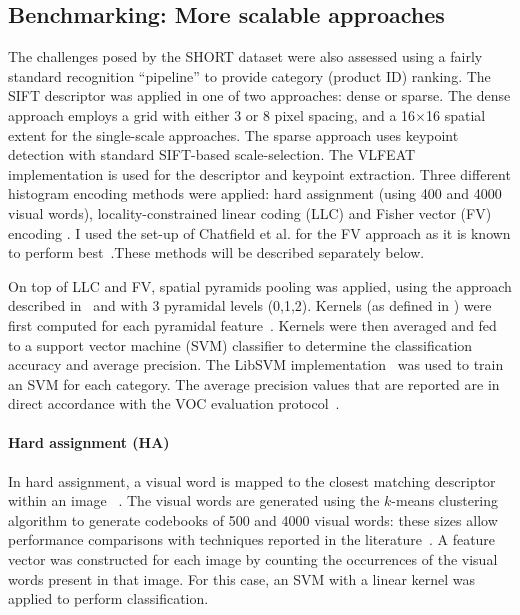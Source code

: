 


\subsection{Benchmarking: More scalable approaches}
\label{sec:bof}

The challenges posed by the SHORT dataset were also assessed using a fairly standard recognition ``pipeline'' to provide category (product ID) ranking. The SIFT descriptor was applied in one of two approaches: dense or sparse. The dense approach employs a grid with either 3 or 8 pixel spacing, and a 16$\times$16 spatial extent for the single-scale approaches. The sparse approach uses keypoint detection with standard SIFT-based scale-selection. The VLFEAT implementation is used for the descriptor and keypoint extraction. Three different histogram encoding methods were applied: hard assignment \cite{Csurka2004} (using 400 and 4000 visual words), locality-constrained linear coding (LLC) \cite{Wang2010} and Fisher vector (FV) encoding \cite{Perronnin2010}. I used the set-up of Chatfield et al. for the FV approach as it is known to perform best~\cite{Chatfield2011}.These methods will be described separately below. 

On top of LLC and FV, spatial pyramids pooling was applied, using the approach described in~\cite{Lazebnik2006} and with 3 pyramidal levels (0,1,2). Kernels (as defined in \cite{Vedaldi2010}) were first computed for each pyramidal feature~\cite{VanDeSande2010}. Kernels were then averaged and fed to a support vector machine (SVM) classifier to determine the classification accuracy and average precision. The LibSVM implementation~\cite{CC01a} was used to train an SVM for each category. The average precision values that are reported are in direct accordance with the VOC evaluation protocol~\cite{Everingham2009}. 

\paragraph{Hard assignment (HA)} 
In hard assignment, a visual word is mapped to the closest matching descriptor within an image ~\cite{Csurka2004}. The visual words are generated using the $k$-means clustering algorithm to generate codebooks of 500 and 4000 visual words: these sizes allow performance comparisons with techniques reported in the literature~\cite{Chatfield2011}. A feature vector was constructed for each image by counting the occurrences of the visual words present in that image. For this case, an SVM with a linear kernel was applied to perform classification. 

